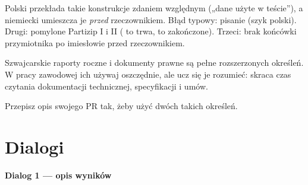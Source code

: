 \begin{falle}
Polski przekłada takie konstrukcje zdaniem względnym („dane użyte w teście”), a niemiecki umieszcza je \emph{przed} rzeczownikiem. Błąd
typowy: pisanie  (szyk polski). Drugi: pomylone Partizip I i II ( to trwa,  to zakończone).
Trzeci: brak końcówki przymiotnika po imiesłowie przed rzeczownikiem.
\end{falle}

\begin{szwajcaria}
Szwajcarskie raporty roczne i dokumenty prawne są pełne rozszerzonych określeń. W pracy zawodowej ich używaj oszczędnie, ale ucz się
je rozumieć: skraca czas czytania dokumentacji technicznej, specyfikacji i umów.
\end{szwajcaria}

\begin{praca}
   Przepisz opis swojego PR tak, żeby użyć dwóch takich określeń.
\end{praca}

\section{Dialogi}
\textbf{Dialog 1 --- opis wyników}
\begin{dialog}
\end{dialog}

